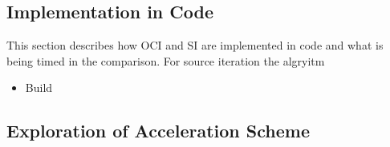 

\subsection{Implementation in Code}

This section describes how OCI and SI are implemented in code and what is being timed in the comparison.
For source iteration the algryitm
\begin{itemize}
    \item Build 
\end{itemize}




\subsection{Exploration of Acceleration Scheme}
\label{ssec:method_acc}

